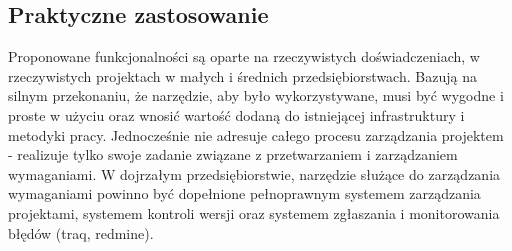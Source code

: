     \subsection{Praktyczne zastosowanie}
      Proponowane funkcjonalności są oparte na rzeczywistych doświadczeniach, w rzeczywistych projektach w małych i średnich przedsiębiorstwach. Bazują na silnym przekonaniu, że narzędzie, aby było wykorzystywane, musi być wygodne i proste w użyciu oraz wnosić wartość dodaną do istniejącej infrastruktury i metodyki pracy. Jednocześnie nie adresuje całego procesu zarządzania projektem - realizuje tylko swoje zadanie związane z przetwarzaniem i zarządzaniem wymaganiami. W dojrzałym przedsiębiorstwie, narzędzie służące do zarządzania wymaganiami powinno być dopełnione pełnoprawnym systemem zarządzania projektami, systemem kontroli wersji oraz systemem zgłaszania i monitorowania błędów (traq, redmine).
